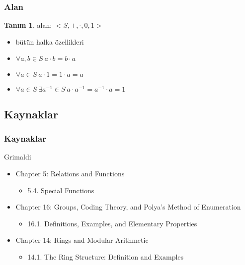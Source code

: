 \documentclass[dvipsnames]{beamer}
\theoremstyle{definition}
\newtheorem{tanim}[theorem]{Tanım}
\theoremstyle{example}
\theoremstyle{plain}
\begin{document}
\begin{frame}
  \frametitle{Alan}

  \begin{tanim}
    \alert{alan}: $<S,+,\cdot,0,1>$
    \begin{itemize}
      \item bütün halka özellikleri

      \pause
      \item $\forall a,b \in S~a \cdot b = b \cdot a$
      \item $\forall a \in S~a \cdot 1 = 1 \cdot a = a$
      \item $\forall a \in S~\exists a^{-1} \in S~a \cdot a^{-1} = a^{-1} \cdot a = 1$
    \end{itemize}
  \end{tanim}
\end{frame}

\subsection*{Kaynaklar}

\begin{frame}
  \frametitle{Kaynaklar}

  \begin{block}{Grimaldi}
    \begin{itemize}
      \item Chapter 5: Relations and Functions
      \begin{itemize}
        \item 5.4. \alert{Special Functions}
      \end{itemize}

      \item Chapter 16: Groups, Coding Theory, and Polya's Method of Enumeration
      \begin{itemize}
        \item 16.1. \alert{Definitions, Examples, and Elementary Properties}
      \end{itemize}

      \item Chapter 14: Rings and Modular Arithmetic
      \begin{itemize}
        \item 14.1. \alert{The Ring Structure: Definition and Examples}
      \end{itemize}
    \end{itemize}
  \end{block}
\end{frame}
\end{document}
